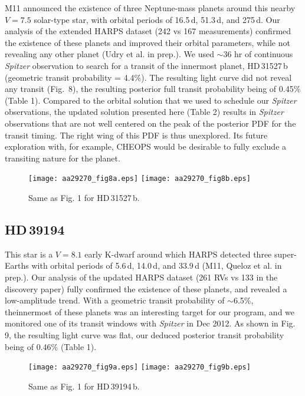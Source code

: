 \documentclass[traditabstract]{aa}
\begin{document}
M11 announced  the existence of three Neptune-mass planets  around this nearby $V=7.5$ solar-type star, with orbital periods of 16.5\,d, 51.3\,d, and 275\,d. Our analysis of the extended HARPS dataset (242 vs 167 
measurements) confirmed the existence of these planets and improved their orbital parameters, while not revealing
any other planet (Udry et al. in prep.). We used $\sim$36 hr of continuous {\it Spitzer} observation to search for a transit of the innermost planet, HD\,31527\,b (geometric transit probability  = 4.4\%). The resulting light curve did not reveal any transit (Fig.~8), the resulting posterior full transit probability being of 0.45\% (Table 1). Compared to the orbital solution that we used to schedule our {\it Spitzer}  observations, the updated solution presented here (Table 2) results in {\it Spitzer} observations that are not well centered on the peak of the posterior PDF for the transit timing. The right wing of this PDF is thus unexplored. Its future exploration with, for example, CHEOPS would be desirable to fully exclude a transiting nature for the planet. 

\begin{figure}
\label{fig:8}
\centering                     
\texttt{[image: aa29270\_fig8a.eps]}
\texttt{[image: aa29270\_fig8b.eps]}
\caption{Same as Fig. 1 for HD\,31527\,b.}
\end{figure}

\subsection{HD\,39194}

This star is a $V=8.1$ early K-dwarf around which HARPS detected three super-Earths  with orbital periods of
5.6\,d, 14.0\,d, and 33.9\,d (M11, Queloz et al. in prep.). Our analysis of the updated HARPS dataset (261 RVs vs  133
in the discovery paper) fully confirmed the existence of these planets, and revealed a low-amplitude trend. 
With a geometric transit probability of $\sim$6.5\%, theinnermost of these planets was an interesting target for 
our program, and we monitored one of its transit windows with {\it Spitzer} in Dec 2012. As shown in Fig. 9, the resulting 
light curve was flat, our deduced posterior transit probability being of 0.46\% (Table 1). 


\begin{figure}
\label{fig:10}
\centering                     
\texttt{[image: aa29270\_fig9a.eps]}
\texttt{[image: aa29270\_fig9b.eps]}
\caption{Same as Fig. 1 for HD\,39194\,b.}
\end{figure}
\end{document}
